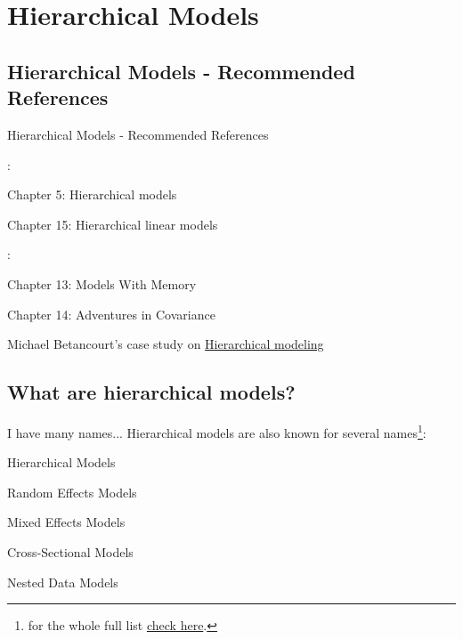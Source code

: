 \section{Hierarchical Models}

\subsection{Hierarchical Models - Recommended References}
\begin{frame}{Hierarchical Models - Recommended References}
	\begin{vfilleditems}
		\item \textcite{gelman2013bayesian}:
		\begin{vfilleditems}
			\item Chapter 5: Hierarchical models
			\item Chapter 15: Hierarchical linear models
		\end{vfilleditems}
		\item \textcite{mcelreath2020statistical}:
		\begin{vfilleditems}
			\item Chapter 13: Models With Memory
			\item Chapter 14: Adventures in Covariance
		\end{vfilleditems}
		\item \textcite{gelmanDataAnalysisUsing2007}
		\item Michael Betancourt's case study on \href{https://betanalpha.github.io/assets/case_studies/hierarchical_modeling.html}{Hierarchical modeling}
		\item \textcite{kruschke2015bayesian}
	\end{vfilleditems}
\end{frame}

\subsection{What are hierarchical models?}
\begin{frame}{I have many names...}
	Hierarchical models are also known for several names\footnote{
		for the whole full list
		\href{https://statmodeling.stat.columbia.edu/2019/09/18/all-the-names-for-hierarchical-and-multilevel-modeling/}{check here}.}:
	\begin{vfilleditems}
		\item Hierarchical Models
		\item Random Effects Models
		\item Mixed Effects Models
		\item Cross-Sectional Models
		\item Nested Data Models
	\end{vfilleditems}
\end{frame}


